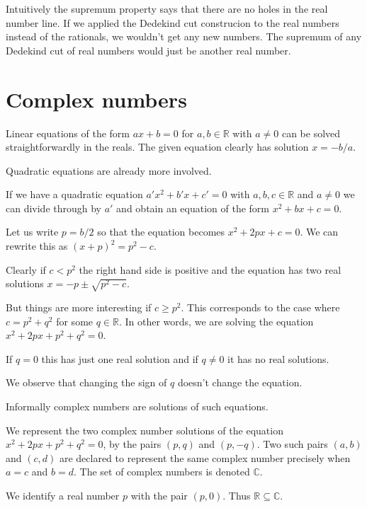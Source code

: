 \documentclass[10pt]{article}
\newcommand{\C}{\mathbb{C}}
\newcommand{\R}{\mathbb{R}}
\newenvironment{definition}[1][Definition]{\begin{trivlist}
\item[\hskip \labelsep {\bfseries #1}]}{\end{trivlist}}
\begin{document}
Intuitively the supremum property says that there are no holes in the real number line. If we applied the Dedekind cut construcion to the real numbers instead of the rationals, we wouldn't get any new numbers. The supremum of any Dedekind cut of real numbers would just be another real number.

\section{Complex numbers}

Linear equations of the form $ax + b = 0$ for $a, b \in \R$ with $a \neq 0$ can be solved straightforwardly in the reals. The given equation clearly has solution $x = -b/a$.

Quadratic equations are already more involved.

If we have a quadratic equation $a'x^2 + b'x + c' = 0$ with $a, b, c \in \R$ and $a \neq 0$ we can divide through by $a'$ and obtain an equation of the form $x^2 + bx + c = 0$.

Let us write $p = b/2$ so that the equation becomes $x^2 + 2px + c = 0$. We can rewrite this as $(x + p)^2 = p^2 - c$.

Clearly if $c < p^2$ the right hand side is positive and the equation has two real solutions $x = -p \pm \sqrt{p^2 - c}$.

But things are more interesting if $c \geq p^2$. This corresponds to the case where $c = p^2 + q^2$ for some $q \in \R$. In other words, we are solving the equation $x^2 + 2px + p^2 + q^2 = 0$.

If $q = 0$ this has just one real solution and if $q \neq 0$ it has no real solutions.

We observe that changing the sign of $q$ doesn't change the equation.

Informally complex numbers are solutions of such equations.

\begin{definition}
We represent the two complex number solutions of the equation $x^2 + 2px + p^2 + q^2 = 0$, by the pairs $(p, q)$ and $(p, -q)$. Two such pairs $(a, b)$ and $(c, d)$ are declared to represent the same complex number precisely when $a = c$ and $b = d$. The set of complex numbers is denoted $\C$.
\end{definition}

\begin{definition}
We identify a real number $p$ with the pair $(p, 0)$. Thus $\R \subseteq \C$.
\end{definition}
\end{document}
